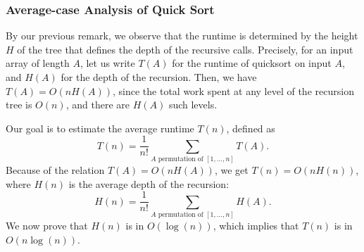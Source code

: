 \documentclass{report}
\begin{document}
\subsubsection{Average-case Analysis of Quick Sort}
By our previous remark, we observe that the runtime is determined by the height $H$ of the tree that defines the depth of the recursive calls.
Precisely, for an input array of length $A$, let us write
$T(A)$ for the runtime of quicksort on input $A$, and $H(A)$ for the depth of the recursion.
Then, we have $T(A) = O(n H(A))$, since the total work spent at any level of the recursion
tree is $O(n)$, and there are $H(A)$ such levels.

Our goal is to estimate the average runtime $T(n)$, defined as 
$$T(n) = \frac 1{n!} \sum_{\text{$A$ permutation of $[1,\dots,n]$}} T(A).$$
Because of the relation $T(A) = O(n H(A))$, we get $T(n) = O(n H(n))$,
where $H(n)$ is the average depth of the recursion:
$$H(n) = \frac 1{n!} \sum_{\text{$A$ permutation of $[1,\dots,n]$}} H(A).$$
We now prove that $H(n)$ is in $O(\log(n))$, which implies that 
$T(n)$ is in $O(n \log(n))$.
\end{document}
